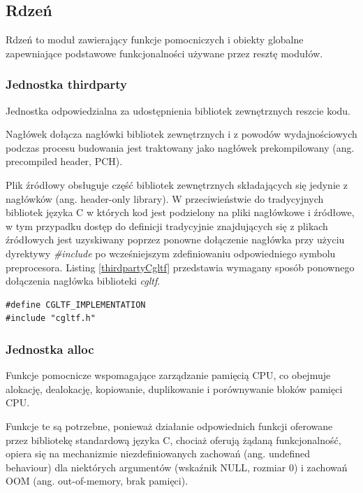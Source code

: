 \subsection{Rdzeń}

Rdzeń to moduł zawierający funkcje pomocniczych i obiekty globalne zapewniające podstawowe funkcjonalności używane przez resztę modułów.

\subsubsection{Jednostka thirdparty}
Jednostka odpowiedzialna za udostępnienia bibliotek zewnętrznych reszcie kodu.

Nagłówek dołącza nagłówki bibliotek zewnętrznych i z powodów wydajnościowych podczas procesu budowania jest traktowany jako nagłówek prekompilowany (ang. precompiled header, PCH).

Plik źródłowy obsługuje część bibliotek zewnętrznych składających się jedynie z nagłówków (ang. header-only library).
W przeciwieństwie do tradycyjnych bibliotek języka C w których kod jest podzielony na pliki nagłówkowe i źródłowe, w tym przypadku dostęp do definicji tradycyjnie znajdujących się z plikach źródłowych jest uzyskiwany poprzez ponowne dołączenie nagłówka przy użyciu dyrektywy \textit{\#include} po wcześniejszym zdefiniowaniu odpowiedniego symbolu preprocesora.
Listing \ref{thirdpartyCgltf} przedstawia wymagany sposób ponownego dołączenia nagłówka biblioteki \textit{cgltf}.
\lstset{language=C}
\begin{lstlisting}[caption={Przykład dołączenia implementacji biblioteki \textit{cgltf}},captionpos=b,label={thirdpartyCgltf}]
#define CGLTF_IMPLEMENTATION
#include "cgltf.h"
\end{lstlisting}

\subsubsection{Jednostka alloc}
Funkcje pomocnicze wspomagające zarządzanie pamięcią CPU, co obejmuje alokację, dealokację, kopiowanie, duplikowanie i porównywanie bloków pamięci CPU.

Funkcje te są potrzebne, ponieważ działanie odpowiednich funkcji oferowane przez bibliotekę standardową języka C, chociaż oferują żądaną funkcjonalność, opiera się na mechanizmie niezdefiniowanych zachowań (ang. undefined behaviour) dla niektórych argumentów (wskaźnik NULL, rozmiar 0) i zachowań OOM (ang. out-of-memory, brak pamięci).

